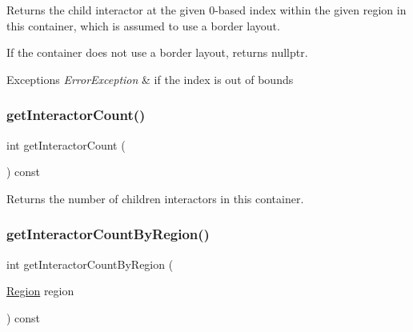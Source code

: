 Returns the child interactor at the given 0-\/based index within the given region in this container, which is assumed to use a border layout. 

If the container does not use a border layout, returns nullptr. 
\begin{DoxyExceptions}{Exceptions}
{\em Error\+Exception} & if the index is out of bounds \\
\hline
\end{DoxyExceptions}
\mbox{\label{classsgl_1_1GContainer_a789affbf8e89e65e3afd63cc626f5a81}} 
\subsubsection{\texorpdfstring{get\+Interactor\+Count()}{getInteractorCount()}}
{\footnotesize\ttfamily int get\+Interactor\+Count (\begin{DoxyParamCaption}{ }\end{DoxyParamCaption}) const\hspace{0.3cm}{\ttfamily [virtual]}}



Returns the number of children interactors in this container. 

\mbox{\label{classsgl_1_1GContainer_a668fe9a4efc31fa065ded79c0e5eab64}} 
\subsubsection{\texorpdfstring{get\+Interactor\+Count\+By\+Region()}{getInteractorCountByRegion()}\hspace{0.1cm}{\footnotesize\ttfamily [1/2]}}
{\footnotesize\ttfamily int get\+Interactor\+Count\+By\+Region (\begin{DoxyParamCaption}\item[{\mbox{\hyperlink{classsgl_1_1GContainer_a81a01a86de31071a92e6cce0bab9bc4b}{Region}}}]{region }\end{DoxyParamCaption}) const\hspace{0.3cm}{\ttfamily [virtual]}}



